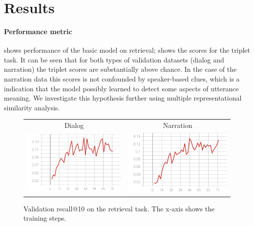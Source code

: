 \section{Results}
\label{sec:results}
\paragraph{Performance metric}
  shows performance of the basic model on
 retrieval;  shows the scores for the triplet
 task. It can be seen that for both types of validation datasets
 (dialog and narration) the triplet scores are substantially above
 chance. In the case of the narration data this scores is not
 confounded by speaker-based clues, which is a indication that the
 model possibly learned to detect some aspects of utterance
 meaning. We investigate this hypothesis further using multiple
 representational similarity analysis.
 
\begin{figure}
  \centering
  \begin{tabular}{cc}
    Dialog & Narration \\
    \includegraphics[scale=0.3]{val_rec10.png} & \includegraphics[scale=0.3]{valnarr_rec10.png}\\
  \end{tabular}
  \caption{Validation recall@10 on the retrieval task. The x-axis
    shows the training steps.}
  \label{fig:retrieval}
\end{figure}

